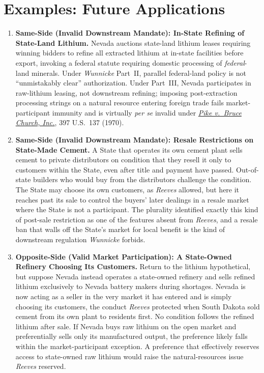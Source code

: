 \documentclass[12pt]{article}
\begin{document}
\section{Examples: Future Applications}
\begin{enumerate}

\item \textbf{Same-Side (Invalid Downstream Mandate): In-State Refining of State-Land Lithium.} Nevada auctions state-land lithium leases requiring winning bidders to refine all extracted lithium at in-state facilities before export, invoking a federal statute requiring domestic processing of \emph{federal}-land minerals. Under \textit{Wunnicke} Part~II, parallel federal-land policy is not ``unmistakably clear'' authorization. Under Part~III, Nevada participates in raw-lithium leasing, not downstream refining; imposing post-extraction processing strings on a natural resource entering foreign trade fails market-participant immunity and is virtually \textit{per se} invalid under \href{https://supreme.justia.com/cases/federal/us/397/137/}{\textit{Pike v.\ Bruce Church, Inc.}}, 397 U.S.\ 137 (1970).

\item \textbf{Same-Side (Invalid Downstream Mandate): Resale Restrictions on State-Made Cement.} A State that operates its own cement plant sells cement to private distributors on condition that they resell it only to customers within the State, even after title and payment have passed. Out-of-state builders who would buy from the distributors challenge the condition. The State may choose its own customers, as \textit{Reeves} allowed, but here it reaches past its sale to control the buyers' later dealings in a resale market where the State is not a participant. The plurality identified exactly this kind of post-sale restriction as one of the features absent from \textit{Reeves}, and a resale ban that walls off the State's market for local benefit is the kind of downstream regulation \textit{Wunnicke} forbids.

\item \textbf{Opposite-Side (Valid Market Participation): A State-Owned Refinery Choosing Its Customers.} Return to the lithium hypothetical, but suppose Nevada instead operates a state-owned refinery and sells refined lithium exclusively to Nevada battery makers during shortages. Nevada is now acting as a seller in the very market it has entered and is simply choosing its customers, the conduct \textit{Reeves} protected when South Dakota sold cement from its own plant to residents first. No condition follows the refined lithium after sale. If Nevada buys raw lithium on the open market and preferentially sells only its manufactured output, the preference likely falls within the market-participant exception. A preference that effectively reserves access to state-owned raw lithium would raise the natural-resources issue \textit{Reeves} reserved.


\end{enumerate}
\end{document}
